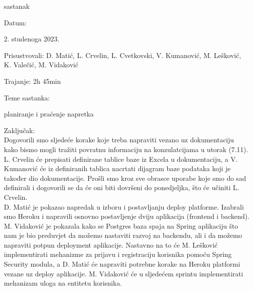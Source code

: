 \begin{packed_enum}
\begin{packed_item}
			\end{packed_item}
			

            \item  sastanak
			\item[] \begin{packed_item}
				\item Datum: \date[{2. studenoga 2023.}
				\item Prisustvovali: D. Matić, L. Crvelin, L. Cvetkovski, V. Kumanović, M. Lešković, K. Valečić, M. Vidaković
				\item Trajanje: 2h 45min
				\item Teme sastanka: 
				\begin{packed_item}
					\item  planiranje i praćenje napretka
				\end{packed_item}
                \item Zaključak: \\
                Dogovorili smo sljedeće korake koje treba napraviti vezano uz dokumentaciju kako bismo mogli tražiti povratnu
                informaciju na konzulatcijama u utorak (7.11). L. Crvelin će prepisati definirane tablice baze iz Excela u
                dokumentaciju, a V. Kumanović će iz definiranih tablica nacrtati dijagram baze podataka koji je također dio
                dokumentacije. Prošli smo kroz sve obrasce uporabe koje smo do sad definirali i dogovorili se da će oni biti dovršeni do
                ponedjeljka, što će učiniti L. Crvelin. \\
                
                D. Matić je pokazao napredak u izboru i postavljanju deploy platforme. Izabrali smo Heroku i napravili osnovno
                postavljenje dviju aplikacija (frontend i backend). \\
                
                M. Vidaković je pokazala kako se Postgres baza spaja na Spring aplikaciju što nam je bio preduvjet da možemo nastaviti
                razvoj na backendu, ali i da možemo napraviti potpun deployment aplikacije. Nastavno na to će M. Lešković
                implementirati mehanizme za prijavu i registraciju korisnika pomoću Spring Security modula, a D. Matić će napraviti
                potrebne korake na Heroku platformi vezane uz deploy aplikacije. M. Vidaković će u sljedećem sprintu implementirati
                mehanizam uloga na entitetu korisnika. \\
                

\end{packed_item}
\end{packed_enum}
